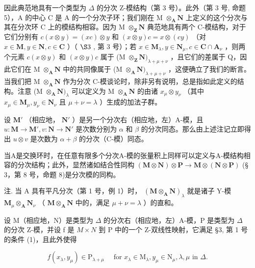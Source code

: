 因此典范地具有一个类型为 \(\Delta\) 的分次 Z-模结构（第 3 号）。此外（第 3 号, 命题 5），A 的中心 C 是 A 的一个分次子环；我们刚在 M \(\otimes_{\mathbf{A}} \mathbf{N}\) 上定义的这个分次与其在分次环 C 上的模结构相容。因为 M \(\otimes_{\mathbf{Z}} \mathbf{N}\) 典范地具有两个 C-模结构，对于它们分别有 \(c(x \otimes y) = (xc) \otimes y\) 和 \((x \otimes y)c = x \otimes (cy)\) （对 \(x \in \mathbf{M}, y \in \mathbf{N}, c \in \mathbf{C}\) ）（ \(\S 3\) , 第 3 号）；若 \(x \in \mathbf{M}_{\lambda}, y \in \mathbf{N}_{\mu}, c \in \mathbf{C} \cap \mathbf{A}_{\nu}\) ，则两个元素 \(c(x \otimes y)\) 和 \((x \otimes y)c\) 属于 (M \(\otimes_{\mathbf{Z}} \mathbf{N})_{\lambda + \mu + \nu}\) ，且它们的差属于 Q，因此它们在 M \(\otimes_{\mathbf{A}} \mathbf{N}\) 中的共同像属于 (M \(\otimes_{\mathbf{A}} \mathbf{N})_{\lambda + \mu + \nu}\) ，这便确立了我们的断言。当我们把 M \(\otimes_{\mathbf{A}} \mathbf{N}\) 作为分次 C-模谈论时，除非另有说明，总是指如此定义的结构。注意 (M \(\otimes_{\mathbf{A}} \mathbf{N})_{\lambda}\) 可以定义为 M \(\otimes_{\mathbf{A}} \mathbf{N}\) 的由诸 \(x_{\mu} \otimes y_{\nu}\) （其中 \(x_{\mu} \in \mathbf{M}_{\mu}, y_{\nu} \in \mathbf{N}_{\nu}\) 且 \(\mu + \nu = \lambda\) ）生成的加法子群。

设 \(\mathbf{M}'\) （相应地， \(\mathbf{N}'\) ）是另一个分次右（相应地，左）A-模，且 \(u: \mathbf{M} \to \mathbf{M}', v: \mathbf{N} \to \mathbf{N}'\) 是次数分别为 \(\alpha\) 和 \(\beta\) 的分次同态。那么由上述注记立即得出 \(u \otimes v\) 是次数为 \(\alpha + \beta\) 的分次（C-模）同态。

当A是交换环时，在任意有限多个分次A-模的张量积上同样可以定义与A-模结构相容的分次结构；此外，显然诸如结合性同构 \((\mathbf{M} \otimes \mathbf{N}) \otimes \mathbf{P} \to \mathbf{M} \otimes (\mathbf{N} \otimes \mathbf{P})\) (§ 3，第 8 号，命题 8)是分次模的同构。

注. 当 A 具有平凡分次（第 1 号，例 1）时， \((\mathbf{M} \otimes_{\mathbf{A}} \mathbf{N})_{\lambda}\) 就是诸子 Y-模 \(\mathbf{M}_{\mu} \otimes_{\mathbf{A}} \mathbf{N}_{\nu}\) （ \(\mathbf{M} \otimes_{\mathbf{A}} \mathbf{N}\) 中的，满足 \(\mu + \nu = \lambda\) ）的直和。

设 M（相应地，N）是类型为 \(\Delta\) 的分次右（相应地，左）A-模，P 是类型为 \(\Delta\) 的分次 Z-模，并设 f 是 \(M \times N\) 到 P 中的一个 Z-双线性映射，它满足 §3, 第 1 号的条件 (1)，且此外使得

\[
f (x _ {\lambda}, y _ {\mu}) \in \mathrm{P} _ {\lambda + \mu} \quad \text { for } x _ {\lambda} \in \mathrm{M} _ {\lambda}, y _ {\mu} \in \mathrm{N} _ {\mu}, \lambda , \mu \text { in } \Delta .
\]


